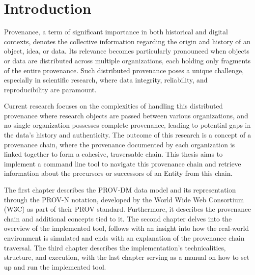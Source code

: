 \documentclass[
  digital,     %
  oneside,     %
  nosansbold,  %
  nocolorbold, %
  lof,         %
  lot,         %
]{fithesis4}
\begin{document}
\chapter*{Introduction}
\shorthandoff{-}
Provenance, a term of significant importance in both historical and digital contexts, denotes the collective information regarding the origin and history of an object, idea, or data. Its relevance becomes particularly pronounced when objects or data are distributed across multiple organizations, each holding only fragments of the entire provenance. Such distributed provenance poses a unique challenge, especially in scientific research, where data integrity, reliability, and reproducibility are paramount.

Current research \cite{research} focuses on the complexities of handling this distributed provenance where research objects are passed between various organizations, and no single organization possesses complete provenance, leading to potential gaps in the data's history and authenticity. The outcome of this research is a concept of a provenance chain, where the provenance documented by each organization is linked together to form a cohesive, traversable chain. This thesis aims to implement a command line tool to navigate this provenance chain and retrieve information about the precursors or successors of an Entity from this chain. 

The first chapter describes the PROV-DM data model and its representation through the PROV-N notation, developed by the World Wide Web Consortium (W3C) as part of their PROV standard. Furthermore, it describes the provenance chain and additional concepts tied to it. The second chapter delves into the overview of the implemented tool, follows with an insight into how the real-world environment is simulated and ends with an explanation of the provenance chain traversal. The third chapter describes the implementation's technicalities, structure, and execution, with the last chapter serving as a manual on how to set up and run the implemented tool.
\shorthandon{-}
\end{document}

